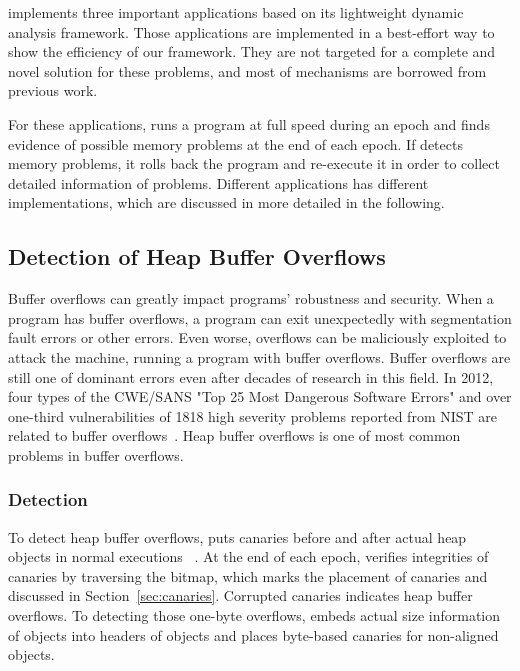 \label{sec:applications}

\doubletake{} implements three important applications based on its lightweight dynamic analysis framework. 
Those applications are implemented in a best-effort way to show the efficiency of our framework.
They are not targeted for a complete and novel solution for these problems, and most of mechanisms are borrowed from previous work. 

For these applications, \doubletake{} runs a program at full speed during an epoch and finds evidence of possible memory problems at the end of each epoch. 
If \doubletake{} detects memory problems, it rolls back the program and re-execute it in order to collect detailed information of problems. Different applications has different implementations, which are discussed in more detailed 
in the following. 

\subsection{Detection of Heap Buffer Overflows}
\label{sec:overflow}
Buffer overflows can greatly impact programs' robustness and security. When a program has buffer overflows, a program can exit unexpectedly with segmentation fault errors or other errors. Even worse, overflows can be maliciously exploited to attack the machine, running a program with buffer overflows. 
Buffer overflows are still one of dominant errors even after decades of research in this field. In 2012, four types of the CWE/SANS "Top 25 Most Dangerous Software Errors" and  over one-third vulnerabilities of 1818 high severity problems reported from NIST are related to buffer overflows~\cite{overflow:lbc, overflows2, overflows1}. Heap buffer overflows is one of most common problems in buffer overflows. 

\subsubsection{Detection}
To detect heap buffer overflows, \DoubleTake{} puts canaries before and after actual heap objects in normal executions ~\cite{overflow:lbc, AddressSanitizer}. At the end of each epoch, \doubletake{} verifies integrities of canaries by traversing the bitmap, which marks the placement of canaries and discussed in Section~\ref{sec:canaries}.  
Corrupted canaries indicates heap buffer overflows. To detecting those one-byte overflows, \doubletake{} embeds actual size information of objects into headers of objects and places byte-based canaries for non-aligned objects.

